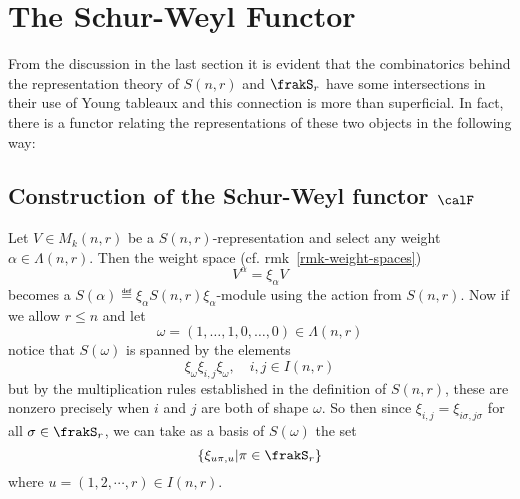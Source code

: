 \documentclass[12pt]{article}
\begin{document}


\newpage
\section{The Schur-Weyl Functor}
From the discussion in the last section it is evident that the combinatorics behind the representation theory of $S(n,r)$ and $\frakS_r$ have some intersections
in their use of Young tableaux and this connection is more than superficial. In fact, there is a functor relating the representations
of these two objects in the following way:
\subsection{Construction of the Schur-Weyl functor \texorpdfstring{$\calF$}{F}}

Let $V\in M_k(n,r)$ be a $S(n,r)$-representation and select any weight $\alpha\in\Lambda(n,r)$. Then the weight space (cf. rmk~\ref{rmk-weight-spaces})
\[V^\alpha=\xi_\alpha V\]
becomes a $S(\alpha)\eqdef\xi_\alpha S(n,r)\xi_\alpha$-module using the action from $S(n,r)$. Now if we allow $r\le n$ and let
\[\omega=(1,\dots,1,0,\dots,0)\in\Lambda(n,r)\]
notice that $S(\omega)$ is spanned by the elements
\[\xi_\omega\xi_{i,j}\xi_\omega,\quad i,j\in I(n,r)\]
but by the multiplication rules established in the definition of $S(n,r)$, these are nonzero precisely when 
$i$ and $j$ are both of shape $\omega$. So then since $\xi_{i,j}=\xi_{i\sigma,j\sigma}$ for all $\sigma\in\frakS_r$, we can take as
a basis of $S(\omega)$ the set 
\[\{\xi_{u\pi,u}|\pi\in\frakS_r\}\]
where $u=(1,2,\cdots,r)\in I(n,r)$.
\end{document}
